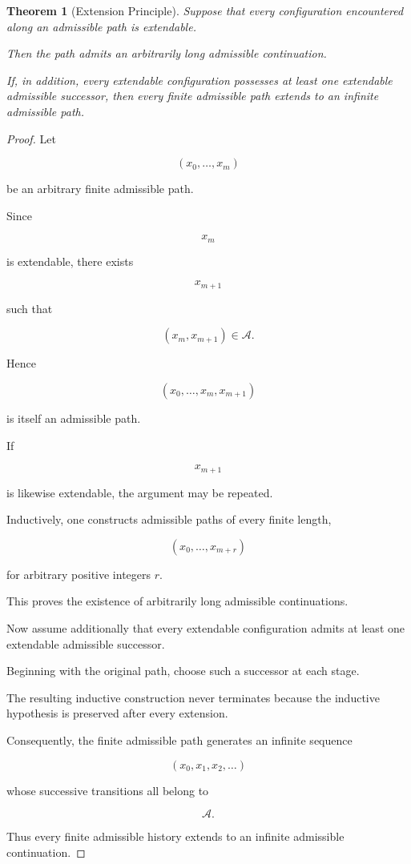 \documentclass[11pt]{book}
\numberwithin{equation}{chapter}
\theoremstyle{definition}
\theoremstyle{plain}
\newtheorem{theorem}[definition]{Theorem}
\begin{document}
\begin{theorem}[Extension Principle]

Suppose that every configuration encountered along an admissible path is extendable.

Then the path admits an arbitrarily long admissible continuation.

If, in addition, every extendable configuration possesses at least one extendable admissible successor, then every finite admissible path extends to an infinite admissible path.

\end{theorem}

\begin{proof}

Let

\[
(x_0,\ldots,x_m)
\]

be an arbitrary finite admissible path.

Since

\[
x_m
\]

is extendable, there exists

\[
x_{m+1}
\]

such that

\[
(x_m,x_{m+1})\in\mathcal A.
\]

Hence

\[
(x_0,\ldots,x_m,x_{m+1})
\]

is itself an admissible path.

If

\[
x_{m+1}
\]

is likewise extendable, the argument may be repeated.

Inductively, one constructs admissible paths of every finite length,

\[
(x_0,\ldots,x_{m+r})
\]

for arbitrary positive integers \(r\).

This proves the existence of arbitrarily long admissible continuations.

Now assume additionally that every extendable configuration admits at least one extendable admissible successor.

Beginning with the original path, choose such a successor at each stage.

The resulting inductive construction never terminates because the inductive hypothesis is preserved after every extension.

Consequently, the finite admissible path generates an infinite sequence

\[
(x_0,x_1,x_2,\ldots)
\]

whose successive transitions all belong to

\[
\mathcal A.
\]

Thus every finite admissible history extends to an infinite admissible continuation.

\end{proof}
\end{document}

